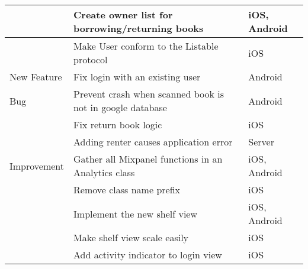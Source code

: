 \begin{longtable}{|L{2cm}|L{10cm}|L{3cm}|}
  \hline
 & Create owner list for borrowing/returning books & iOS, Android \\
  \hline
 & Make User conform to the Listable protocol & iOS \\
  \hline
New Feature & Fix login with an existing user & Android \\
 \hline
Bug & Prevent crash when scanned book is not in google database & Android \\
 \hline
 & Fix return book logic & iOS \\
  \hline
 & Adding renter causes application error & Server \\
  \hline
Improvement & Gather all Mixpanel functions in an Analytics class & iOS, Android \\
 \hline
 & Remove class name prefix & iOS \\
  \hline
 & Implement the new shelf view & iOS, Android \\
  \hline
 & Make shelf view scale easily & iOS \\
  \hline
 & Add activity indicator to login view & iOS \\
  \hline
\end{longtable}